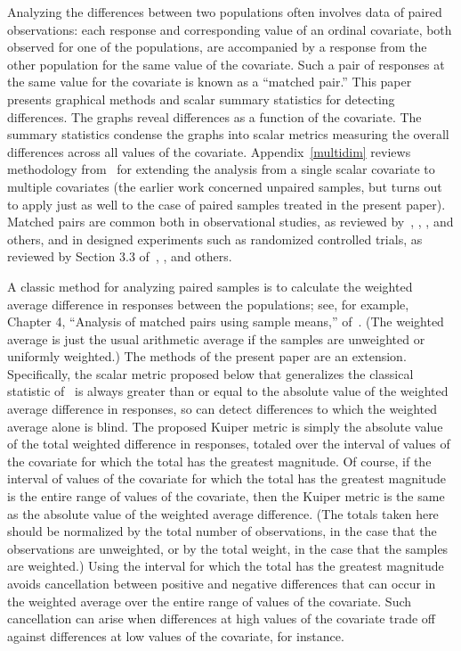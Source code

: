 \documentclass[]{fairmeta}
\begin{document}
Analyzing the differences between two populations often involves data
of paired observations: each response and corresponding value
of an ordinal covariate, both observed for one of the populations,
are accompanied by a response from the other population for the same value
of the covariate. Such a pair of responses at the same value for the covariate
is known as a ``matched pair.'' This paper presents graphical methods
and scalar summary statistics for detecting differences.
The graphs reveal differences as a function of the covariate.
The summary statistics condense the graphs into scalar metrics
measuring the overall differences across all values of the covariate.
Appendix~\ref{multidim} reviews methodology from~\cite{tygert_multidim}
for extending the analysis from a single scalar covariate
to multiple covariates (the earlier work concerned unpaired samples,
but turns out to apply just as well to the case of paired samples
treated in the present paper).
Matched pairs are common both in observational studies,
as reviewed by~\cite{rubin}, \cite{caliendo-kopeinig}, \cite{austin},
and others, and in designed experiments such as randomized controlled trials,
as reviewed by Section 3.3 of~\cite{cox-reid}, \cite{bai-romano-shaikh},
and others.

A classic method for analyzing paired samples is to calculate
the weighted average difference in responses between the populations;
see, for example, Chapter 4, ``Analysis of matched pairs using sample means,''
of~\cite{brown-hollander}. (The weighted average is just the usual arithmetic
average if the samples are unweighted or uniformly weighted.) The methods
of the present paper are an extension. Specifically, the scalar metric proposed
below that generalizes the classical statistic of~\cite{kuiper} is always
greater than or equal to the absolute value of the weighted average difference
in responses, so can detect differences to which the weighted average alone
is blind. The proposed Kuiper metric is simply the absolute value
of the total weighted difference in responses, totaled over the interval
of values of the covariate for which the total has the greatest magnitude.
Of course, if the interval of values of the covariate for which the total
has the greatest magnitude is the entire range of values of the covariate,
then the Kuiper metric is the same as the absolute value
of the weighted average difference. (The totals taken here should be normalized
by the total number of observations, in the case that the observations
are unweighted, or by the total weight, in the case that the samples
are weighted.)
Using the interval for which the total has the greatest magnitude
avoids cancellation between positive and negative differences
that can occur in the weighted average over the entire range of values
of the covariate. Such cancellation can arise when differences
at high values of the covariate trade off against differences at low values
of the covariate, for instance.
\end{document}
